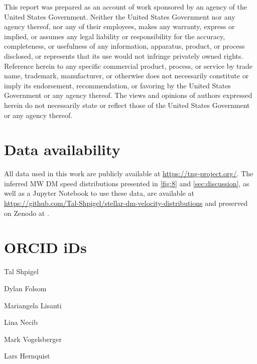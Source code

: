 \documentclass[twocolumn,tighten,twocolappendix]{aastex701}
\begin{document}
This report was prepared as an account of work sponsored by an agency of the United States Government. Neither the United States Government nor any agency thereof, nor any of their employees, makes any warranty, express or implied, or assumes any legal liability or responsibility for the accuracy, completeness, or usefulness of any information, apparatus, product, or process disclosed, or represents that its use would not infringe privately owned rights. Reference herein to any specific commercial product, process, or service by trade name, trademark, manufacturer, or otherwise does not necessarily constitute or imply its endorsement, recommendation, or favoring by the United States Government or any agency thereof. The views and opinions of authors expressed herein do not necessarily state or reflect those of the United States Government or any agency thereof.


\section*{Data availability}
All data used in this work are publicly available at \href{https://tng-project.org/}{https://tng-project.org/}. The inferred MW DM speed distributions presented in \autoref{fig:8} and \autoref{sec:discussion}, as well as a Jupyter Notebook to use these data, are available at \url{https://github.com/Tal-Shpigel/stellar-dm-velocity-distributions} and preserved on Zenodo at .

\section*{ORCID \MakeLowercase{i}Ds}
\noindent Tal Shpigel~\par
\noindent Dylan Folsom~\par
\noindent Mariangela Lisanti~\par
\noindent Lina Necib~\par
\noindent Mark Vogelsberger~\par
\noindent Lars Hernquist~
\onecolumngrid
\clearpage
\end{document}
